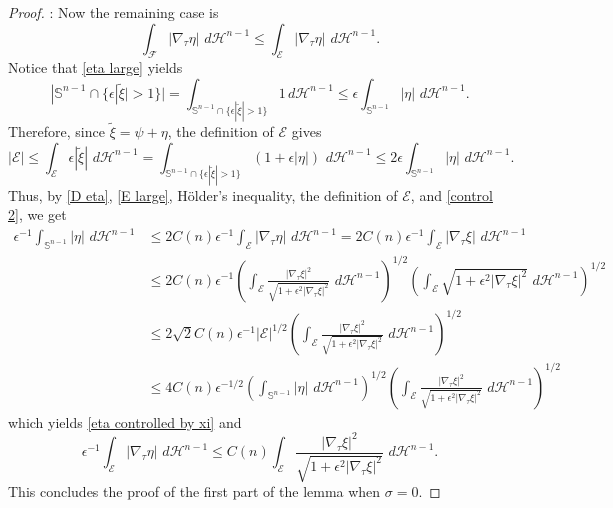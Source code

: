 \documentclass[10pt,a4paper]{amsart}
\def\ez{\epsilon}
\def\sz{\sigma}
\begin{document}
\begin{proof}
\medskip
{}: Now the remaining case is
\begin{equation}\label{E large}
\int_{\mathcal F}  |\nabla_\tau \eta| \, \,d\mathscr H^{n-1}\le \int_{\mathcal E }  |\nabla_\tau \eta| \, \,d\mathscr H^{n-1}.
\end{equation}
Notice that  \eqref{eta large} yields
$$|\mathbb S^{n-1}\cap\{\ez|\tilde\xi|>1\}|= \int_{\mathbb S^{n-1}\cap\{\ez|\tilde\xi|>1\}} 1\, d\mathscr H^{n-1} \le \ez \int_{\mathbb S^{n-1}} |\eta|  \, \,d\mathscr H^{n-1}.$$
Therefore, since $\tilde\xi=\psi+\eta$, the definition of $\mathcal E$ gives
\begin{equation}\label{control 2}
|\mathcal E|\le \int_{\mathcal E} \ez|\tilde\xi| \,  \,d\mathscr H^{n-1}= \int_{\mathbb S^{n-1}\cap\{\ez|\tilde\xi|>1\}} (1+\ez|\eta|) \,  \,d\mathscr H^{n-1}\le 2\ez \int_{\mathbb S^{n-1}} |\eta|  \, \,d\mathscr H^{n-1}.
\end{equation}
Thus, by \eqref{D eta}, \eqref{E large}, H\"older's inequality, the definition of $\mathcal E$, and \eqref{control 2}, we get
\begin{align*}
\ez^{-1}\int_{\mathbb S^{n-1}} |\eta|  \, \,d\mathscr H^{n-1}& \leq 2 C(n) \ez^{-1} \int_{\mathcal E}  |\nabla_\tau \eta| \, \,d\mathscr H^{n-1} =2C(n) \ez^{-1} \int_{\mathcal E}  |\nabla_\tau \xi| \, \,d\mathscr H^{n-1}\nonumber\\
& \leq 2 C(n)\ez^{-1} \left(\int_{\mathcal E}   \frac{|\nabla_\tau  \xi|^2}{\sqrt{1+\ez^2|\nabla_\tau \xi|^2}}  \, \,d\mathscr H^{n-1}\right)^{1/2} \left(\int_{\mathcal E}    {\sqrt{1+\ez^2|\nabla_\tau \xi|^2}}  \, \,d\mathscr H^{n-1}\right)^{1/2}\nonumber\\
& \leq 2\sqrt{2} C(n)\ez^{-1} |\mathcal E|^{1/2} \left(\int_{\mathcal E}   \frac{|\nabla_\tau  \xi|^2}{\sqrt{1+\ez^2|\nabla_\tau \xi|^2}}  \, \,d\mathscr H^{n-1}\right)^{1/2}\nonumber\\
& \leq 4 C(n) \ez^{-1/2}  \left(\int_{\mathbb S^{n-1}}   |\eta|  \, \,d\mathscr H^{n-1} \right)^{1/2}    \left(\int_{\mathcal E}   \frac{|\nabla_\tau  \xi|^2}{\sqrt{1+\ez^2|\nabla_\tau \xi|^2}}  \, \,d\mathscr H^{n-1}\right)^{1/2}
\end{align*}
which yields \eqref{eta controlled by xi}  and
\begin{equation}\label{eta W11}
    \ez^{-1} \int_{\mathcal E}  |\nabla_\tau \eta| \, \,d\mathscr H^{n-1} \le C(n)\int_{\mathcal E}   \frac{|\nabla_\tau  \xi|^2}{\sqrt{1+\ez^2|\nabla_\tau \xi|^2}}  \, \,d\mathscr H^{n-1}.
\end{equation}
This concludes the proof of the first part of the lemma when $\sz=0$.


\end{proof}
\end{document}
